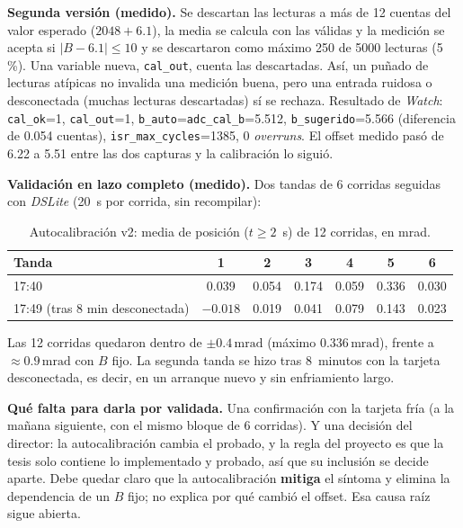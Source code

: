 \documentclass[12pt,letterpaper]{article}
\newcommand{\cod}[1]{\texttt{\detokenize{#1}}}
\newcommand{\mrad}{\,\mathrm{mrad}}
\begin{document}
\textbf{Segunda versión (medido).} Se descartan las lecturas a más de 12 cuentas del valor esperado ($2048+6.1$), la media se calcula con las válidas y la medición se acepta si $|B-6.1|\le 10$ y se descartaron como máximo 250 de 5000 lecturas (5\,\%). Una variable nueva, \texttt{cal\_out}, cuenta las descartadas. Así, un puñado de lecturas atípicas no invalida una medición buena, pero una entrada ruidosa o desconectada (muchas lecturas descartadas) sí se rechaza. Resultado de \textit{Watch}: \texttt{cal\_ok}=1, \texttt{cal\_out}=1, \texttt{b\_auto}=\texttt{adc\_cal\_b}=5.512, \texttt{b\_sugerido}=5.566 (diferencia de 0.054 cuentas), \texttt{isr\_max\_cycles}=1385, 0 \textit{overruns}. El offset medido pasó de 6.22 a 5.51 entre las dos capturas y la calibración lo siguió.

\textbf{Validación en lazo completo (medido).} Dos tandas de 6 corridas seguidas con \textit{DSLite} (20~s por corrida, sin recompilar):

\begin{table}[!htbp]
\centering
\caption{Autocalibración v2: media de posición ($t\ge 2$~s) de 12 corridas, en mrad.}
\label{tab:autocal}
\begin{tabular}{lcccccc}
\toprule
\textbf{Tanda} & \textbf{1} & \textbf{2} & \textbf{3} & \textbf{4} & \textbf{5} & \textbf{6} \\
\midrule
17:40 & 0.039 & 0.054 & 0.174 & 0.059 & 0.336 & 0.030 \\
17:49 (tras 8 min desconectada) & $-0.018$ & 0.019 & 0.041 & 0.079 & 0.143 & 0.023 \\
\bottomrule
\end{tabular}
\end{table}

Las 12 corridas quedaron dentro de $\pm 0.4\mrad$ (máximo $0.336\mrad$), frente a $\approx 0.9\mrad$ con $B$ fijo. La segunda tanda se hizo tras 8~minutos con la tarjeta desconectada, es decir, en un arranque nuevo y sin enfriamiento largo.

\textbf{Qué falta para darla por validada.} Una confirmación con la tarjeta fría (a la mañana siguiente, con el mismo bloque de 6 corridas). Y una decisión del director: la autocalibración cambia el \cod{main} probado, y la regla del proyecto es que la tesis solo contiene lo implementado y probado, así que su inclusión se decide aparte. Debe quedar claro que la autocalibración \textbf{mitiga} el síntoma y elimina la dependencia de un $B$ fijo; no explica por qué cambió el offset. Esa causa raíz sigue abierta.
\end{document}

